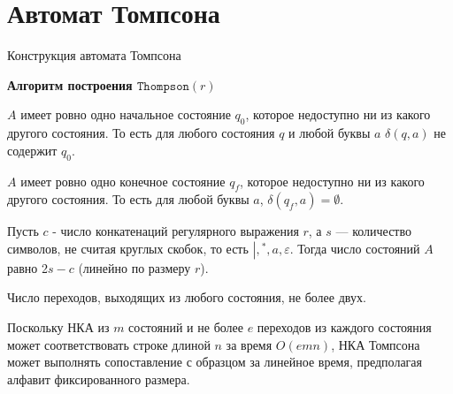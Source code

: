 \documentclass[mathserif]{beamer}
\def\Thompson{\mathtt{Thompson}}
\def\alter{\ensuremath{\mathrel{\vert}}}%
\def\star{\ensuremath{^{*}}}%
\newcommand{\empt}{\varepsilon} %
\newenvironment{wideitemize}{\itemize\addtolength{\itemsep}{8pt}}{\enditemize}
\begin{document}
\section{Автомат Томпсона}
\begin{frame}{Конструкция автомата Томпсона} {\vspace{-5pt}}
    \vspace{-5pt}
    \begin{block}{\bf Алгоритм построения $\Thompson(r)$}
        \begin{wideitemize}
             {
                \item $A$ имеет ровно одно начальное состояние $q_{0}$, которое недоступно ни из какого другого состояния. То есть для любого состояния $q$ и любой буквы $a$ $\delta (q,a)$ не содержит $q_{0}$.
                \item $A$ имеет ровно одно конечное состояние $q_{f}$, которое недоступно ни из какого другого состояния. То есть для любой буквы $a$, $\delta (q_{f},a)=\emptyset$.
                \item Пусть $c$ - число конкатенаций регулярного выражения $r$, а $s$ — количество символов, не считая круглых скобок, то есть $\alter, \star, a, \empt$. Тогда число состояний $A$ равно 2$s - c$ (линейно по размеру $r$).
            }  {
                \item Число переходов, выходящих из любого состояния, не более двух.
                \item Поскольку НКА из $m$ состояний и не более $e$ переходов из каждого состояния может соответствовать строке длиной $n$ за время $O(emn)$, НКА Томпсона может выполнять сопоставление с образцом за линейное время, предполагая алфавит фиксированного размера.
            }
        \end{wideitemize}
    \end{block}
\end{frame} %
\end{document}

